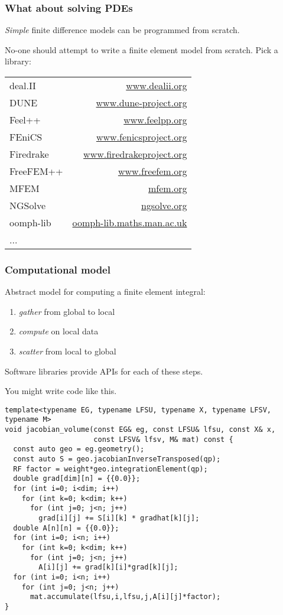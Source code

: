\documentclass[presentation]{beamer}
\begin{document}
\begin{frame}
  \frametitle{What about solving PDEs}
  \emph{Simple} finite difference models can be programmed from scratch.

  No-one should attempt to write a finite element model from
  scratch. Pick a library:
  \begin{center}
    \small
    \begin{tabular}{lr}
      deal.II   & \url{www.dealii.org}            \\
      DUNE      & \url{www.dune-project.org}      \\
      Feel++    & \url{www.feelpp.org}            \\
      FEniCS    & \url{www.fenicsproject.org}     \\
      Firedrake & \url{www.firedrakeproject.org}  \\
      FreeFEM++ & \url{www.freefem.org}           \\
      MFEM      & \url{mfem.org}                  \\
      NGSolve   & \url{ngsolve.org}               \\
      oomph-lib & \url{oomph-lib.maths.man.ac.uk} \\
      ...       &                                 \\
    \end{tabular}
  \end{center}
\end{frame}

\begin{frame}
  \frametitle{Computational model}
  Abstract model for computing a finite element
  integral:
  \begin{enumerate}
  \item \emph{gather} from global to local
  \item \emph{compute} on local data
  \item \emph{scatter} from local to global
  \end{enumerate}

  Software libraries provide APIs for each of these steps.
\end{frame}

\begin{frame}[fragile]
  You might write code like this.

\begin{verbatim}
template<typename EG, typename LFSU, typename X, typename LFSV, typename M>
void jacobian_volume(const EG& eg, const LFSU& lfsu, const X& x, 
                     const LFSV& lfsv, M& mat) const {
  const auto geo = eg.geometry();
  const auto S = geo.jacobianInverseTransposed(qp);
  RF factor = weight*geo.integrationElement(qp);
  double grad[dim][n] = {{0.0}};
  for (int i=0; i<dim; i++)
    for (int k=0; k<dim; k++)
      for (int j=0; j<n; j++)
        grad[i][j] += S[i][k] * gradhat[k][j];
  double A[n][n] = {{0.0}};
  for (int i=0; i<n; i++)
    for (int k=0; k<dim; k++)
      for (int j=0; j<n; j++)
        A[i][j] += grad[k][i]*grad[k][j];
  for (int i=0; i<n; i++)
    for (int j=0; j<n; j++)
      mat.accumulate(lfsu,i,lfsu,j,A[i][j]*factor);
}
\end{verbatim}
\end{frame}
\end{document}
